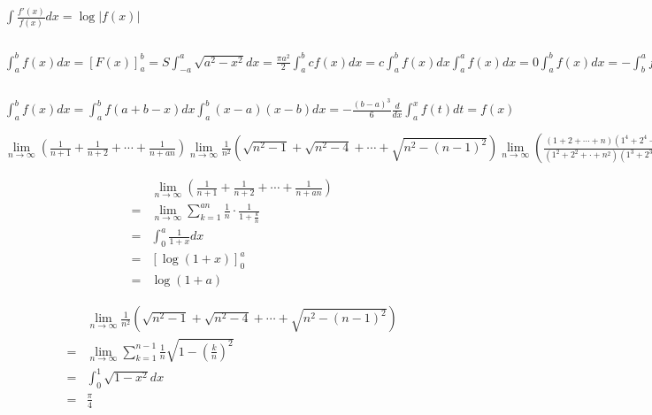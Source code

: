 $
\int \frac{f'(x)}{f(x)}dx = \log|f(x)|
$

$
\int_{a}^{b}f(x)dx = \left[ F(x)\right]^b_a=S
\int_{-a}^{a}\sqrt{a^2-x^2}dx = \frac{\pi a^2}{2}
\int_{a}^{b}cf(x)dx = c\int_{a}^{b}f(x)dx 
\int_{a}^{a}f(x)dx = 0
\int_{a}^{b}f(x)dx = -\int_{b}^{a}f(x)dx 
\int_{a}^{b}f(x)dx + \int_{b}^{c}f(x)dx = \int_{a}^{c}f(x)dx 
\int_{a}^{b}f(x)dx \pm \int_{a}^{b}g(x)dx  = \int_{a}^{b} \{f(x)\pm g(x)\}dx 
\int_{-a}^{a}f(x)dx = 
\begin{cases}
2 \int_{0}^{a}f(x)dx & f(x): \text{偶関数}\\
0 & f(x): \text{奇関数}
\end{cases}
f(x)\geq g(x) \Rightarrow \int_{a}^{b}f(x)dx \geq \int_{a}^{b} g(x)dx
\left\{\int_{a}^{b}f(x)g(x)dx\right\}^2 \leq \left( \int_{a}^{b}\{f(x)\}^2dx\right)\left( \int_{a}^{b}\{g(x)\}^2dx\right)
$

$
\int_{a}^{b}f(x)dx = \int_{a}^{b}f(a+b-x)dx
\int_{a}^{b}(x-a)(x-b)dx = -\frac{(b-a)^3}{6}
\frac{d}{dx}\int_{a}^{x}f(t)dt=f(x)
$

$
\lim\limits_{n\to\infty}\left(\frac{1}{n+1}+\frac{1}{n+2}+\cdots+\frac{1}{n+an}\right)
\lim\limits_{n\to\infty}\frac{1}{n^2}\left(\sqrt{n^2-1}+\sqrt{n^2-4}+\cdots+\sqrt{n^2-(n-1)^2}\right)
\lim\limits_{n\to\infty}\left(\frac{(1+2+\cdots+n)(1^4+2^4+\cdots+n^4)}{(1^2+2^2+\cdot+n^2)(1^3+2^3+\cdot+n^3)}\right)
$

\begin{eqnarray*}
&&\lim\limits_{n\to\infty}\left(\frac{1}{n+1}+\frac{1}{n+2}+\cdots+\frac{1}{n+an}\right)\\
&=&\lim\limits_{n\to\infty}\sum\limits_{k=1}^{an}\frac{1}{n}\cdot\frac{1}{1+\frac{k}{n}}\\
&=&\int_{0}^{a}\frac{1}{1+x} dx\\
&=&\left[\log(1+x)\right]^a_0\\
&=&\log(1+a)
\end{eqnarray*}

\begin{eqnarray*}
&&\lim\limits_{n\to\infty}\frac{1}{n^2}\left(\sqrt{n^2-1}+\sqrt{n^2-4}+\cdots+\sqrt{n^2-(n-1)^2}\right)\\
&=&\lim\limits_{n\to\infty}\sum\limits_{k=1}^{n-1}\frac{1}{n}\sqrt{1-\left(\frac{k}{n}\right)^2}\\
&= & \int_{0}^{1}\sqrt{1-x^2}dx\\
&=&\frac{\pi}{4}
\end{eqnarray*}


